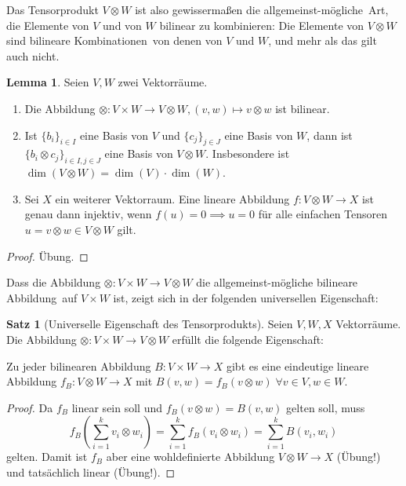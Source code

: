 \documentclass[a4paper]{scrbook}
\numberwithin{equation}{chapter}
\theoremstyle{definition}
\newtheorem{lemma}[defn]{Lemma}
\newtheorem{satz}[defn]{Satz}
\newcommand{\bewUeb}{\begin{proof}Übung.\end{proof}}
\begin{document}
Das Tensorprodukt $V\otimes W$ ist also gewissermaßen die \glqq allgemeinst-mögliche\grqq\ Art, die Elemente von $V$ und von $W$ bilinear zu kombinieren: Die Elemente von $V\otimes W$ sind \glqq bilineare Kombinationen\grqq\ von denen von $V$ und $W$, und mehr als das gilt auch nicht.
\begin{lemma} \label{lemma:tensor_prod}
	Seien $V,W$ zwei Vektorräume.
	\begin{enumerate}[label=(\alph*)]
		\item Die Abbildung $\otimes\colon V\times W\to V\otimes W, (v,w) \mapsto v\otimes w$ ist bilinear.
		\item Ist $\{b_i\}_{i\in I}$ eine Basis von $V$ und $\{c_j\}_{j\in J}$ eine Basis von $W$, dann ist $\{b_i \otimes c_j\}_{i\in I, j\in J}$ eine Basis von $V\otimes W$. Insbesondere ist $\dim(V\otimes W) = \dim(V) \cdot \dim(W)$.
		\item \label{item:tensor_prod_inj} Sei $X$ ein weiterer Vektorraum. Eine lineare Abbildung $f\colon V\otimes W \to X$ ist genau dann injektiv, wenn $f(u) = 0 \implies u = 0$ für alle einfachen Tensoren $u = v\otimes w \in V\otimes W$ gilt.
	\end{enumerate}
	\bewUeb
\end{lemma}
Dass die Abbildung $\otimes\colon V\times W \to V\otimes W$ die \glqq allgemeinst-mögliche bilineare Abbildung\grqq\ auf $V\times W$ ist, zeigt sich in der folgenden universellen Eigenschaft:
\begin{satz}[Universelle Eigenschaft des Tensorprodukts]
	Seien $V,W,X$ Vektorräume. Die Abbildung $\otimes\colon V\times W \to V\otimes W$ erfüllt die folgende Eigenschaft:

	Zu jeder bilinearen Abbildung $B\colon V\times W \to X$ gibt es eine eindeutige lineare Abbildung $f_B\colon V\otimes W \to X$ mit $B(v,w) = f_B(v\otimes w) \; \forall v\in V, w\in W$.

	\begin{center}
	\end{center}

	\begin{proof}
		Da $f_B$ linear sein soll und $f_B(v\otimes w) = B(v,w)$ gelten soll, muss
		\[f_B\left(\sum_{i=1}^k v_i \otimes w_i\right) = \sum_{i=1}^k f_B(v_i \otimes w_i) = \sum_{i=1}^k B(v_i,w_i)\]
		gelten. Damit ist $f_B$ aber eine wohldefinierte Abbildung $V\otimes W \to X$ (Übung!) und tatsächlich linear (Übung!).
	\end{proof}
\end{satz}
\end{document}
